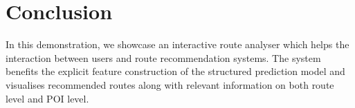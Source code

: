 \section{Conclusion}
In this demonstration, we showcase an interactive route analyser which helps the interaction between users and route recommendation systems. 
The system benefits the explicit feature construction of the structured prediction model and visualises recommended routes along with relevant information on both route level and POI level.
